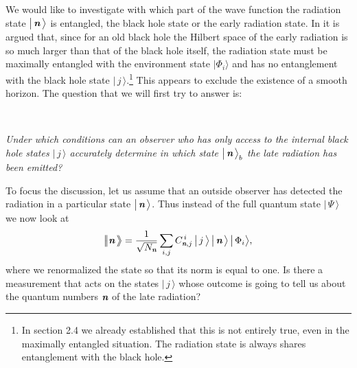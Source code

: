 \documentclass[12pt]{article}%
\def\spc{\hspace{.5pt}}
\def\be{\begin{equation}}
\def\ee{\end{equation}}
\begin{document}
 We would like to investigate with which part of the wave function the radiation state
$\bigl| \,{ \textit{\textbf n}}\, \bigr\rangle$ is entangled, the black hole state or the early radiation state. In \cite{amps} it is argued that, since for an old black hole 
the Hilbert space of the early radiation is so much larger than that of the black hole itself,  the radiation state must be maximally entangled with the environment state $\bigl|\Phi_i\bigr\rangle $ and has no entanglement with the black hole state $\bigl|\,j\,\bigr\rangle $.\footnote{ In section 2.4 we already established that this is not entirely true, even in the maximally entangled situation. The radiation state is always shares entanglement with the black hole. } This appears to exclude the existence of a smooth horizon. The question that we will first try to answer is:
\medskip

\noindent 
${}$~\parbox{16cm}{\it Under which conditions can an observer who has only access to the internal black hole states $\bigl|\, j\, \bigr\rangle$ accurately determine in which state $\bigl|\, { \textit{\textbf n}}\, \bigr\rangle_b$ the late radiation has been emitted?}

\smallskip

\noindent
To focus the discussion, let us assume that  an outside observer has detected the radiation  in a particular state $\bigl|\, { \textit{\textbf n}}\,\bigr\rangle$.  Thus instead of the full quantum 
state $\bigl|\, \Psi\,\bigr\rangle$ we now look at
\be
\label{newstatet}
\bigl|\!\nspc\spc\bigl|\nom \,\bigr\rangle\!\!\bigr\rangle = {1\over \sqrt{N_\nom}}\sum_{i, j} C^{\,i}_{\nom, j} \,\bigl| \,j\,\bigr \rangle \,\bigl| \,\nom\,\bigr \rangle\, \bigl| \,\Phi_i\bigr \rangle,
\ee
where we renormalized the state so that its norm is equal to one. 
Is there a measurement that acts on the states $\bigl|\,j\,\bigr\rangle $ whose outcome is going to tell us about the quantum numbers ${ \textit{\textbf n}}$ of the late radiation?
\end{document}

